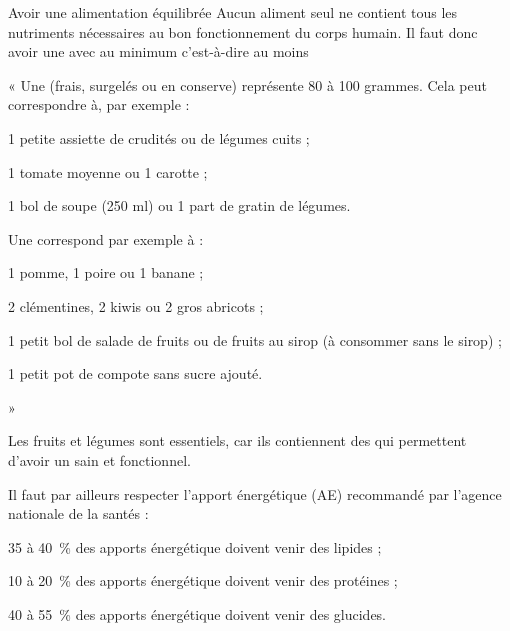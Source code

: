 \begin{doc}{Avoir une alimentation équilibrée}
  Aucun aliment seul ne contient tous les nutriments nécessaires au bon fonctionnement du corps humain.
  Il faut donc avoir une  avec au minimum  c'est-à-dire au moins 

  \begin{importants}
    « Une  (frais, surgelés ou en conserve) représente 80 à 100 grammes. Cela peut correspondre à, par exemple :
    \begin{listePoints}
      \item 1 petite assiette de crudités ou de légumes cuits ;
      \item 1 tomate moyenne ou 1 carotte ;
      \item 1 bol de soupe (250 ml) ou 1 part de gratin de légumes.
    \end{listePoints}
    Une  correspond par exemple à :
    \begin{listePoints}
      \item 1 pomme, 1 poire ou 1 banane ;
      \item 2 clémentines, 2 kiwis ou 2 gros abricots ;
      \item 1 petit bol de salade de fruits ou de fruits au sirop (à consommer sans le sirop) ;
      \item 1 petit pot de compote sans sucre ajouté.
    \end{listePoints}
     »
  \end{importants}

  Les fruits et légumes sont essentiels, car ils contiennent des  qui permettent d'avoir un  sain et fonctionnel.

  \begin{importants}  
    Il faut par ailleurs respecter l'apport énergétique (AE) recommandé par l'agence nationale de la santés :
    \begin{listePoints}
      \item \num{35} à \qty{40}{\percent} des apports énergétique doivent venir des lipides ;
      \item \num{10} à \qty{20}{\percent} des apports énergétique doivent venir des protéines ;
      \item \num{40} à \qty{55}{\percent} des apports énergétique doivent venir des glucides.
    \end{listePoints}
  \end{importants}
\end{doc}

